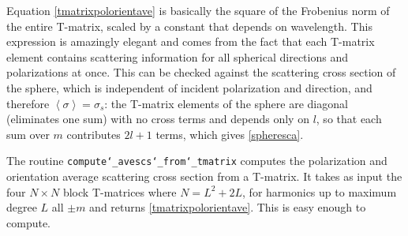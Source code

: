 Equation \eqref{tmatrixpolorientave} is basically the square of the Frobenius norm of the entire T-matrix, scaled by a constant that depends on wavelength. This expression is amazingly elegant and comes from the fact that each T-matrix element contains scattering information for all spherical directions and polarizations at once. This can be checked against the scattering cross section of the sphere, which is independent of incident polarization and direction, and therefore $\left< \sigma \right> = \sigma_s$: the T-matrix elements of the sphere are diagonal (eliminates one sum) with no cross terms and depends only on $l$, so that each sum over $m$ contributes $2l+1$ terms, which gives \eqref{spheresca}.  

The routine \texttt{compute\char`_avescs\char`_from\char`_tmatrix}  computes the polarization and orientation average scattering cross section from a T-matrix. It takes as input the four $N \times N$ block T-matrices where $N = L^2 + 2L$, for harmonics up to maximum degree $L$ all $\pm m$ and returns \eqref{tmatrixpolorientave}. This is easy enough to compute.


{\footnotesize
{}
}


